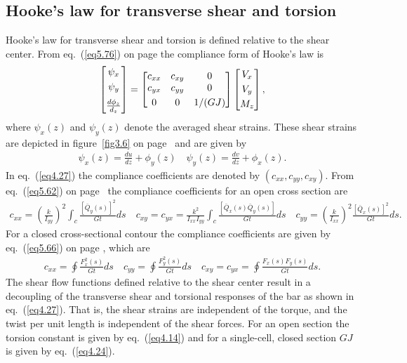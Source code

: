 \documentclass{AeroStructure-ERJohnson}
\begin{document}
\subsection{Hooke's law for transverse shear and torsion}\label{sec4.1.3}

Hooke's law for transverse shear and torsion is defined relative to the shear center. From eq.~(\ref{eq5.76}) on page \pageref{eq5.76} the compliance form of Hooke's law is
\begin{align}\label{eq4.27}
\left[\begin{array}{@{}c@{}}\psi_{x} \\[3pt]\psi_{y} \\[6pt]\frac{d \phi_{z}}{d_{z}}\end{array}\right]=\left[\begin{array}{@{}ccc@{}}c_{x x} & c_{x y} & 0 \\c_{y x} & c_{y y} & 0 \\[3pt] 0 & 0 & 1 /(G J)\end{array}\right]\left[\begin{array}{@{}c@{}}V_{x} \\[3pt] V_{y} \\[3pt] M_{z}\end{array}\right],
\end{align}
where $\psi_{x}(z)$ and $\psi_{y}(z)$ denote the averaged shear strains. These shear strains are depicted in figure~\ref{fig3.6} on page~\pageref{fig3.6} and are given by
\begin{align}\label{eq4.28}
\psi_{x}(z)=\frac{d u}{d z}+\phi_{y}(z) \quad \psi_{y}(z)=\frac{d v}{d z}+\phi_{x}(z).
\end{align}
In eq.~(\ref{eq4.27}) the compliance coefficients are denoted by $\left(c_{x x}, c_{y y}, c_{x y}\right)$. From eq.~(\ref{eq5.62}) on page~\pageref{eq5.62} the compliance coefficients for an open cross section are
\begin{align}\label{eq4.29}
c_{x x}=\left(\frac{k}{I_{y y}}\right)^{2} \int_{c} {\frac{\left[\bar{Q}_{y}(s)\right]^{2}}{G t} d s} \quad c_{x y}=c_{y x}=\frac{k^{2}}{I_{x x} I_{y y}} \int_{c} {\frac{\left[\bar{Q}_{x}(s) \bar{Q}_{y}(s)\right]}{G t} d s} \quad c_{y y}=\left(\frac{k}{I_{x x}}\right)^{2} \frac{\left[\bar{Q}_{x}(s)\right]^{2}}{G t} d s.
\end{align}
For a closed cross-sectional contour the compliance coefficients are given by eq.~(\ref{eq5.66}) on page \pageref{eq5.66}, which are
\begin{align}\label{eq4.30}
c_{x x}=\oint\! \frac{F_{x}^{2}(s)}{G t} d s \quad c_{y y}=\oint\! \frac{F_{y}^{2}(s)}{G t} d s \quad c_{x y}=c_{y x}=\oint\! \frac{F_{x}(s) F_{y}(s)}{G t} d s.
\end{align}
The shear flow functions defined relative to the shear center result in a decoupling of the transverse shear and torsional responses of the bar as shown in eq.~(\ref{eq4.27}). That is, the shear strains are independent of the torque, and the twist per unit length is independent of the shear forces. For an open section the torsion constant is given by eq.~(\ref{eq4.14}) and for a single-cell, closed section $G J$ is given by eq.~(\ref{eq4.24})\vadjust{\vspace*{10pt}\pagebreak}.
\end{document}
